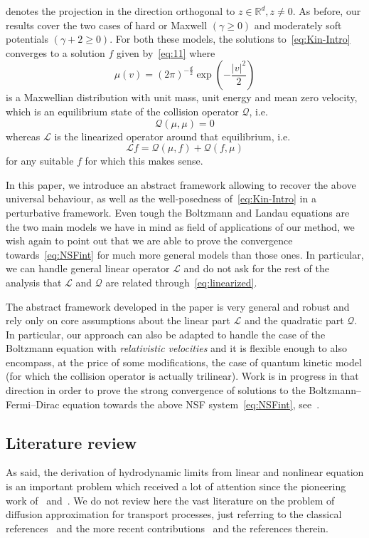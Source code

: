 \documentclass[10pt]{amsart}
\theoremstyle{definition}\newtheorem{defi}[theo]{Definition}\newtheorem{rema}[theo]{Remark}\newtheorem{exam}[theo]{Example}\newtheorem{exem}[theo]{Example}\newtheorem{nota}[theo]{Notation}
\newcommand{\R}{\mathbb{R}}
\newcommand{\LL}{\mathcal{L}}
\newcommand{\QQ}{\mathcal{Q}}
\renewcommand*\ge{\geqslant}
\begin{document}
denotes the projection in the direction orthogonal to $z \in \R^{d},z\neq 0$. As before, our results cover the two cases of hard {or Maxwell $(\gamma \ge 0)$ and moderately soft potentials $(\gamma + 2 \ge 0)$}. For both these models, the solutions to~\eqref{eq:Kin-Intro} converges to a solution $f$ given by~\eqref{eq:11} where
\[
\mu(v)=(2\pi)^{-\frac{d}{2}}\exp\left(-\frac{|v|^{2}}{2}\right)
\]
is a Maxwellian distribution with {unit mass, unit energy and mean zero velocity}, which is an equilibrium state of the collision operator $\QQ$, i.e.
\[
\QQ(\mu,\mu)=0
\]
whereas $\LL$ is the linearized operator around that equilibrium, i.e.
\begin{equation}\label{eq:linearized}
\LL f=\QQ(\mu,f)+\QQ(f,\mu)
\end{equation}
for any suitable $f$ for which this makes sense.
\medskip


In this paper, we introduce an abstract framework allowing to recover the above universal behaviour, as well as the well-posedness of~\eqref{eq:Kin-Intro} in a perturbative framework. Even tough the Boltzmann and Landau equations are the two main models we have in mind as field of applications of our method, we wish again to point out that we are able to prove the convergence towards~\eqref{eq:NSFint} for much more general models than those ones. In particular, we can handle general linear operator $\LL$ and do not ask for the rest of the analysis that $\LL$ and $\QQ$ are related through~\eqref{eq:linearized}.

The abstract framework developed in the paper is very general and robust and rely only on core assumptions about the linear part $\LL$ and the quadratic part $\QQ$. In particular, our approach can also be adapted to handle the case of the Boltzmann equation with \emph{relativistic velocities} and it is flexible enough to also encompass, at the price of some modifications, the case of quantum kinetic model (for which the collision operator is actually trilinear). Work is in progress in that direction in order to prove the strong convergence of solutions to the Boltzmann--Fermi--Dirac equation towards the above NSF system~\eqref{eq:NSFint}, see~\cite{GL2023}.


\subsection{Literature review}

As said, the derivation of hydrodynamic limits from linear and nonlinear equation is an important problem which received a lot of attention since the pioneering work of~\cite{H1912} and~\cite{E1917}. We do not review here the vast literature on the problem of diffusion approximation for transport processes, just referring to the classical references~\cite{BLP1979,BSS} and the more recent contributions~\cite{BM,GW} and the references therein.
\end{document}
